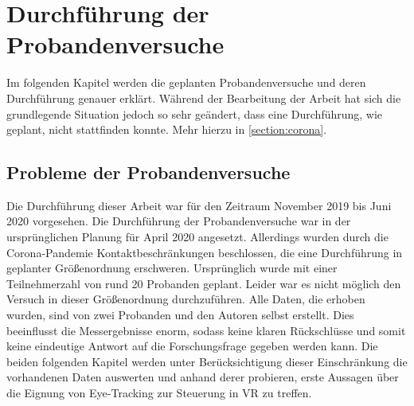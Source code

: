 
\chapter{Durchführung  der Probandenversuche} 
Im folgenden Kapitel werden die geplanten Probandenversuche und deren Durchführung genauer erklärt. Während der Bearbeitung der Arbeit hat sich die grundlegende Situation jedoch so sehr geändert, dass eine Durchführung, wie geplant, nicht stattfinden konnte. Mehr hierzu in \autoref{section:corona}.

\section{Probleme der Probandenversuche}
\label{section:corona}
Die Durchführung dieser Arbeit war für den Zeitraum November 2019 bis Juni 2020 vorgesehen. Die Durchführung der Probandenversuche war in der ursprünglichen Planung für April 2020 angesetzt. Allerdings wurden durch die Corona-Pandemie \cite{rki.2020} Kontaktbeschränkungen beschlossen, die eine Durchführung in geplanter Größenordnung erschweren. Ursprünglich wurde mit einer Teilnehmerzahl von rund 20 Probanden geplant. Leider war es nicht möglich den Versuch in dieser Größenordnung durchzuführen. Alle Daten, die erhoben wurden, sind von zwei Probanden und den Autoren selbst erstellt. Dies beeinflusst die Messergebnisse enorm, sodass keine klaren Rückschlüsse und somit keine eindeutige Antwort auf die Forschungsfrage gegeben werden kann. Die beiden folgenden Kapitel werden unter Berücksichtigung dieser Einschränkung die vorhandenen Daten auswerten und anhand derer probieren, erste Aussagen über die Eignung von Eye-Tracking zur Steuerung in VR zu treffen.

